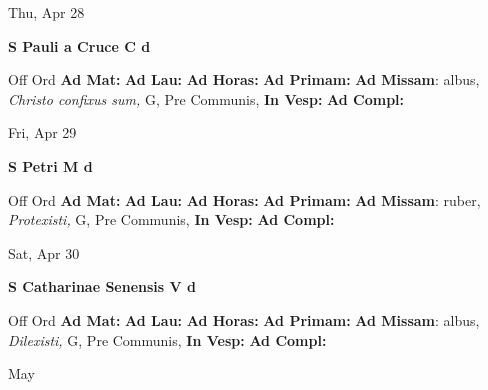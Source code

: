 \documentclass[10pt]{memoir}
\begin{document}
\begin{center}
\begin{minipage}{3.5in}
\vspace{2em}
\begin{center}Thu, Apr 28
\end{center}
\textbf{ \large S Pauli a Cruce C
\textnormal{\normalsize d}}

\begin{justify}Off Ord
\textbf{Ad Mat: }
\textbf{Ad Lau: }
\textbf{Ad Horas: }
\textbf{Ad Primam: }\textbf{Ad Missam}: albus, \textit{Christo confixus sum,} G, Pre Communis, 
\textbf{In Vesp: }
\textbf{Ad Compl: }
\end{justify}
\end{minipage}
\end{center}

\begin{center}
\begin{minipage}{3.5in}
\vspace{2em}
\begin{center}Fri, Apr 29
\end{center}
\textbf{ \large S Petri M
\textnormal{\normalsize d}}

\begin{justify}Off Ord
\textbf{Ad Mat: }
\textbf{Ad Lau: }
\textbf{Ad Horas: }
\textbf{Ad Primam: }\textbf{Ad Missam}: ruber, \textit{Protexisti,} G, Pre Communis, 
\textbf{In Vesp: }
\textbf{Ad Compl: }
\end{justify}
\end{minipage}
\end{center}

\begin{center}
\begin{minipage}{3.5in}
\vspace{2em}
\begin{center}Sat, Apr 30
\end{center}
\textbf{ \large S Catharinae Senensis V
\textnormal{\normalsize d}}

\begin{justify}Off Ord
\textbf{Ad Mat: }
\textbf{Ad Lau: }
\textbf{Ad Horas: }
\textbf{Ad Primam: }\textbf{Ad Missam}: albus, \textit{Dilexisti,} G, Pre Communis, 
\textbf{In Vesp: }
\textbf{Ad Compl: }
\end{justify}
\end{minipage}
\end{center}

\begin{center}
\pagebreak
\thispagestyle{empty}
{\Huge May}
\end{center}
                    
\end{document}
